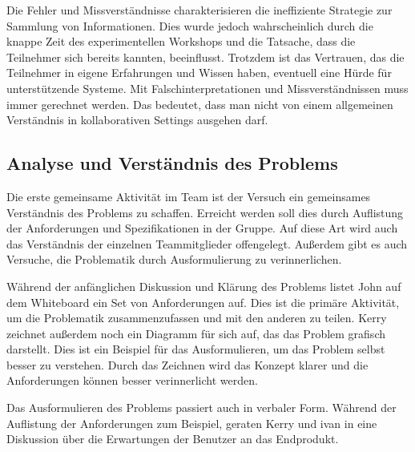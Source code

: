 Die Fehler und Missverständnisse charakterisieren die ineffiziente Strategie zur Sammlung von Informationen. Dies wurde jedoch wahrscheinlich durch die knappe Zeit des experimentellen Workshops und die Tatsache, dass die Teilnehmer sich bereits kannten, beeinflusst. Trotzdem ist das Vertrauen, das die Teilnehmer in eigene Erfahrungen und Wissen haben, eventuell eine Hürde für unterstützende Systeme. Mit Falschinterpretationen und Missverständnissen muss immer gerechnet werden. Das bedeutet, dass man nicht von einem allgemeinen Verständnis in kollaborativen Settings ausgehen darf. 

\subsection{Analyse und Verständnis des Problems}\label{sec:collabProblem} 

Die erste gemeinsame Aktivität im Team ist der Versuch ein gemeinsames Verständnis des Problems zu schaffen. Erreicht werden soll dies durch Auflistung der Anforderungen und Spezifikationen in der Gruppe. Auf diese Art wird auch das Verständnis der einzelnen Teammitglieder offengelegt. Außerdem gibt es auch Versuche, die Problematik durch Ausformulierung zu verinnerlichen.

\medskip Während der anfänglichen Diskussion und Klärung des Problems listet John auf dem Whiteboard ein Set von Anforderungen auf. Dies ist die primäre Aktivität, um die Problematik zusammenzufassen und mit den anderen zu teilen. Kerry zeichnet außerdem noch ein Diagramm für sich auf, das das Problem grafisch darstellt. Dies ist ein Beispiel für das Ausformulieren, um das Problem selbst besser zu verstehen. Durch das Zeichnen wird das Konzept klarer und die Anforderungen können besser verinnerlicht werden.

\medskip Das Ausformulieren des Problems passiert auch in verbaler Form. Während der Auflistung der Anforderungen zum Beispiel, geraten Kerry und ivan in eine Diskussion über die Erwartungen der Benutzer an das Endprodukt.

